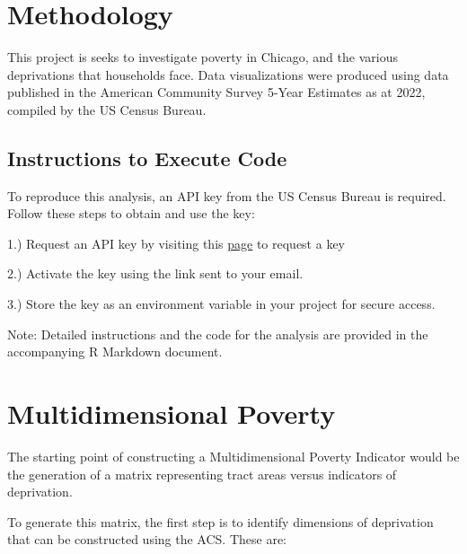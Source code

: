 \documentclass[
  letterpaper,
  DIV=11,
  numbers=noendperiod]{scrreprt}
\begin{document}
\chapter{Methodology}\label{methodology}

This project is seeks to investigate poverty in Chicago, and the various
deprivations that households face. Data visualizations were produced
using data published in the American Community Survey 5-Year Estimates
as at 2022, compiled by the US Census Bureau.

\section{Instructions to Execute
Code}\label{instructions-to-execute-code}

To reproduce this analysis, an API key from the US Census Bureau is
required. Follow these steps to obtain and use the key:

1.) Request an API key by visiting this
\href{https://api.census.gov/data/key_signup.html}{page} to request a
key

2.) Activate the key using the link sent to your email.

3.) Store the key as an environment variable in your project for secure
access.

Note: Detailed instructions and the code for the analysis are provided
in the accompanying R Markdown document.


\chapter{Multidimensional Poverty}\label{multidimensional-poverty}

The starting point of constructing a Multidimensional Poverty Indicator
would be the generation of a matrix representing tract areas versus
indicators of deprivation.

To generate this matrix, the first step is to identify dimensions of
deprivation that can be constructed using the ACS. These are:
\end{document}
